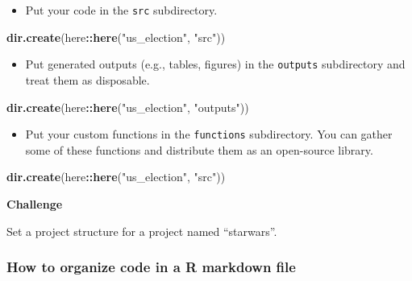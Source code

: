 \documentclass[
]{book}
\newenvironment{Shaded}{\begin{snugshade}}{\end{snugshade}}
\newcommand{\KeywordTok}[1]{\textcolor[rgb]{0.13,0.29,0.53}{\textbf{#1}}}
\newcommand{\NormalTok}[1]{#1}
\newcommand{\OperatorTok}[1]{\textcolor[rgb]{0.81,0.36,0.00}{\textbf{#1}}}
\newcommand{\StringTok}[1]{\textcolor[rgb]{0.31,0.60,0.02}{#1}}
\providecommand{\tightlist}{%
  \setlength{\itemsep}{0pt}\setlength{\parskip}{0pt}}
\begin{document}
\begin{itemize}
\tightlist
\item
  Put your code in the \texttt{src} subdirectory.
\end{itemize}

\begin{Shaded}
\begin{Highlighting}[]
\KeywordTok{dir.create}\NormalTok{(here}\OperatorTok{::}\KeywordTok{here}\NormalTok{(}\StringTok{"us\_election"}\NormalTok{, }\StringTok{"src"}\NormalTok{))}
\end{Highlighting}
\end{Shaded}

\begin{itemize}
\tightlist
\item
  Put generated outputs (e.g., tables, figures) in the \texttt{outputs} subdirectory and treat them as disposable.
\end{itemize}

\begin{Shaded}
\begin{Highlighting}[]
\KeywordTok{dir.create}\NormalTok{(here}\OperatorTok{::}\KeywordTok{here}\NormalTok{(}\StringTok{"us\_election"}\NormalTok{, }\StringTok{"outputs"}\NormalTok{))}
\end{Highlighting}
\end{Shaded}

\begin{itemize}
\tightlist
\item
  Put your custom functions in the \texttt{functions} subdirectory. You can gather some of these functions and distribute them as an open-source library.
\end{itemize}

\begin{Shaded}
\begin{Highlighting}[]
\KeywordTok{dir.create}\NormalTok{(here}\OperatorTok{::}\KeywordTok{here}\NormalTok{(}\StringTok{"us\_election"}\NormalTok{, }\StringTok{"src"}\NormalTok{))}
\end{Highlighting}
\end{Shaded}

\textbf{Challenge}

Set a project structure for a project named ``starwars''.

\hypertarget{how-to-organize-code-in-a-r-markdown-file}{%
\subsubsection{How to organize code in a R markdown file}\label{how-to-organize-code-in-a-r-markdown-file}}
\end{document}
